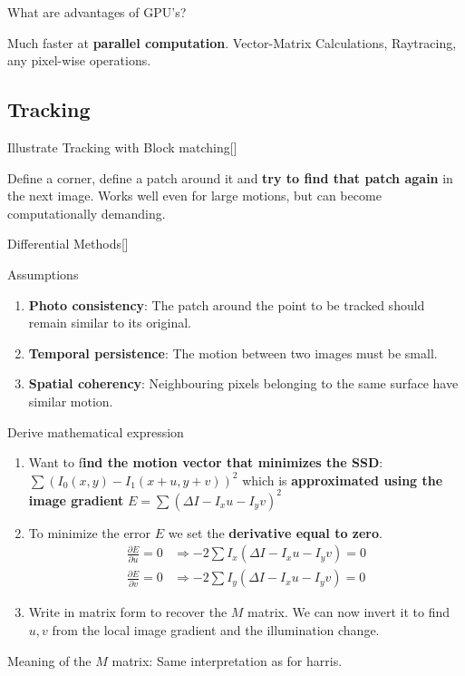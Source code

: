 \documentclass[10pt,a4paper]{scrartcl}
\begin{document}
\begin{multicols*}{2}
\begin{QandA}
{What are advantages of GPU's?}
\item Much faster at \textbf{parallel computation}. Vector-Matrix Calculations, Raytracing, any pixel-wise operations.
\end{QandA}

\subsection*{Tracking}

\begin{QandA}{Illustrate Tracking with Block matching}[\Definition]
\item Define a corner, define a patch around it and \textbf{try to find that patch again} in the next image. Works well even for large motions, but can become computationally demanding. 
\end{QandA}

\begin{QandA}
{Differential Methods}[\Derivation]
\item Assumptions
\begin{enumerate}
\item \textbf{Photo consistency}: The patch around the point to be tracked should remain similar to its original.
\item \textbf{Temporal persistence}: The motion between two images must be small.
\item \textbf{Spatial coherency}: Neighbouring pixels belonging to the same surface have similar motion.
\end{enumerate}
\item Derive mathematical expression
\begin{enumerate}
\item Want to f\textbf{ind the motion vector that minimizes the SSD}: $\sum(I_0(x,y)-I_1(x+u,y+v))^2$ which is \textbf{approximated using the image gradient} $E = \sum(\Delta I-I_x u-I_y v)^2$
\item To minimize the error $E$ we set the \textbf{derivative equal to zero}.
\begin{align*}
\frac{\partial E}{\partial u}=0&\Rightarrow-2\sum I_x(\Delta I-I_xu-I_yv) = 0\\
\frac{\partial E}{\partial v}=0&\Rightarrow-2\sum I_y(\Delta I -I_xu-I_yv)=0
\end{align*}
\item Write in matrix form to recover the $M$ matrix. We can now invert it to find $u,v$ from the local image gradient and the illumination change.
\end{enumerate}
\item Meaning of the $M$ matrix: Same interpretation as for harris.
\end{QandA}


\end{multicols*}
\end{document}
